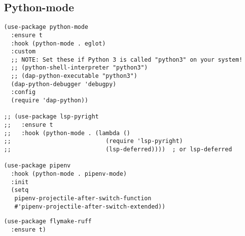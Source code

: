\documentclass[11pt]{article}
\begin{document}
\subsection{Python-mode}
\label{sec:orgfce4b74}
\begin{verbatim}
(use-package python-mode
  :ensure t
  :hook (python-mode . eglot)
  :custom
  ;; NOTE: Set these if Python 3 is called "python3" on your system!
  ;; (python-shell-interpreter "python3")
  ;; (dap-python-executable "python3")
  (dap-python-debugger 'debugpy)
  :config
  (require 'dap-python))

;; (use-package lsp-pyright
;;   :ensure t
;;   :hook (python-mode . (lambda ()
;;                           (require 'lsp-pyright)
;;                           (lsp-deferred))))  ; or lsp-deferred

(use-package pipenv
  :hook (python-mode . pipenv-mode)
  :init
  (setq
   pipenv-projectile-after-switch-function
   #'pipenv-projectile-after-switch-extended))
\end{verbatim}
\begin{verbatim}
(use-package flymake-ruff
  :ensure t)
\end{verbatim}
\end{document}
